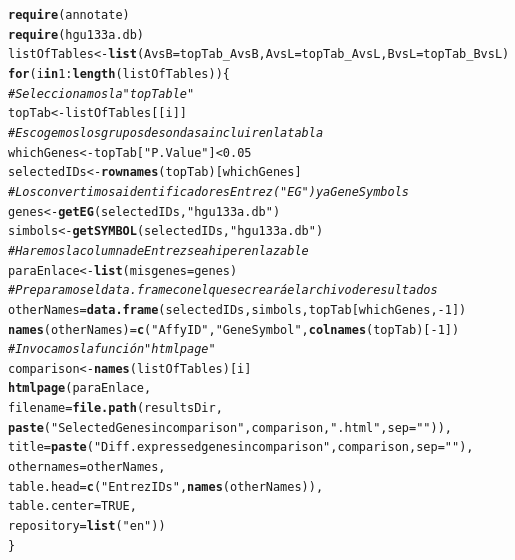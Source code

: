 \documentclass[a4paper]{article}\usepackage[]{graphicx}\usepackage[]{color}
\makeatletter
\newcommand{\hlnum}[1]{\textcolor[rgb]{0.686,0.059,0.569}{#1}}%
\newcommand{\hlstr}[1]{\textcolor[rgb]{0.192,0.494,0.8}{#1}}%
\newcommand{\hlcom}[1]{\textcolor[rgb]{0.678,0.584,0.686}{\textit{#1}}}%
\newcommand{\hlopt}[1]{\textcolor[rgb]{0,0,0}{#1}}%
\newcommand{\hlstd}[1]{\textcolor[rgb]{0.345,0.345,0.345}{#1}}%
\newcommand{\hlkwa}[1]{\textcolor[rgb]{0.161,0.373,0.58}{\textbf{#1}}}%
\newcommand{\hlkwb}[1]{\textcolor[rgb]{0.69,0.353,0.396}{#1}}%
\newcommand{\hlkwc}[1]{\textcolor[rgb]{0.333,0.667,0.333}{#1}}%
\newcommand{\hlkwd}[1]{\textcolor[rgb]{0.737,0.353,0.396}{\textbf{#1}}}%
\newenvironment{kframe}{%
 \def\at@end@of@kframe{}%
 \ifinner\ifhmode%
  \def\at@end@of@kframe{\end{minipage}}%
  \begin{minipage}{\columnwidth}%
 \fi\fi%
 \def\FrameCommand##1{\hskip\@totalleftmargin \hskip-\fboxsep
 \colorbox{shadecolor}{##1}\hskip-\fboxsep
     \hskip-\linewidth \hskip-\@totalleftmargin \hskip\columnwidth}%
 \MakeFramed {\advance\hsize-\width
   \@totalleftmargin\z@ \linewidth\hsize
   \@setminipage}}%
 {\par\unskip\endMakeFramed%
 \at@end@of@kframe}
\newenvironment{knitrout}{}{} %
\makeatother
\begin{document}
\begin{knitrout}
\color{fgcolor}\begin{kframe}
\begin{alltt}
\hlkwd{require}\hlstd{(annotate)}
\hlkwd{require}\hlstd{(hgu133a.db)}
\hlstd{listOfTables} \hlkwb{<-} \hlkwd{list}\hlstd{(}\hlkwc{AvsB} \hlstd{= topTab_AvsB,} \hlkwc{AvsL} \hlstd{= topTab_AvsL,} \hlkwc{BvsL} \hlstd{= topTab_BvsL)}
\hlkwa{for} \hlstd{(i} \hlkwa{in} \hlnum{1}\hlopt{:}\hlkwd{length}\hlstd{(listOfTables))\{}
  \hlcom{# Seleccionamos la "topTable"}
  \hlstd{topTab} \hlkwb{<-} \hlstd{listOfTables[[i]]}
  \hlcom{# Escogemos los grupos de sondas a incluir en la tabla}
  \hlstd{whichGenes}\hlkwb{<-}\hlstd{topTab[}\hlstr{"P.Value"}\hlstd{]}\hlopt{<}\hlnum{0.05}
  \hlstd{selectedIDs} \hlkwb{<-} \hlkwd{rownames}\hlstd{(topTab)[whichGenes]}
  \hlcom{# Los convertimos a identificadores Entrez ("EG") y a Gene Symbols}
  \hlstd{genes}\hlkwb{<-} \hlkwd{getEG}\hlstd{(selectedIDs,} \hlstr{"hgu133a.db"}\hlstd{)}
  \hlstd{simbols} \hlkwb{<-}\hlkwd{getSYMBOL}\hlstd{(selectedIDs,} \hlstr{"hgu133a.db"}\hlstd{)}
  \hlcom{# Haremos la columna de Entrez sea hiperenlazable}
  \hlstd{paraEnlace} \hlkwb{<-} \hlkwd{list} \hlstd{(}\hlkwc{misgenes}\hlstd{=genes)}
  \hlcom{# Preparamos el data.frame con el que se creará el archivo de resultados}
  \hlstd{otherNames} \hlkwb{=} \hlkwd{data.frame}\hlstd{(selectedIDs, simbols, topTab[whichGenes,}\hlopt{-}\hlnum{1}\hlstd{])}
  \hlkwd{names}\hlstd{(otherNames)} \hlkwb{=} \hlkwd{c}\hlstd{(}\hlstr{"Affy ID"}\hlstd{,} \hlstr{"Gene Symbol"}\hlstd{,} \hlkwd{colnames}\hlstd{(topTab)[}\hlopt{-}\hlnum{1}\hlstd{])}
  \hlcom{# Invocamos la función "htmlpage"}
  \hlstd{comparison} \hlkwb{<-} \hlkwd{names}\hlstd{(listOfTables)[i]}
  \hlkwd{htmlpage}\hlstd{(paraEnlace,}
           \hlkwc{filename} \hlstd{=}\hlkwd{file.path}\hlstd{(resultsDir,}
           \hlkwd{paste}\hlstd{(}\hlstr{"Selected Genes in comparison "}\hlstd{,comparison,}\hlstr{".html"}\hlstd{,} \hlkwc{sep}\hlstd{=}\hlstr{""}\hlstd{)) ,}
           \hlkwc{title} \hlstd{=} \hlkwd{paste}\hlstd{(}\hlstr{"Diff. expressed genes in comparison "}\hlstd{, comparison,} \hlkwc{sep}\hlstd{=}\hlstr{""}\hlstd{),}
           \hlkwc{othernames} \hlstd{= otherNames,}
           \hlkwc{table.head} \hlstd{=} \hlkwd{c}\hlstd{(}\hlstr{"Entrez IDs"}\hlstd{,} \hlkwd{names}\hlstd{(otherNames)),}
           \hlkwc{table.center} \hlstd{=} \hlnum{TRUE}\hlstd{,}
           \hlkwc{repository}\hlstd{=}\hlkwd{list}\hlstd{(}\hlstr{"en"}\hlstd{))}
\hlstd{\}}
\end{alltt}
\end{kframe}
\end{knitrout}
\end{document}
